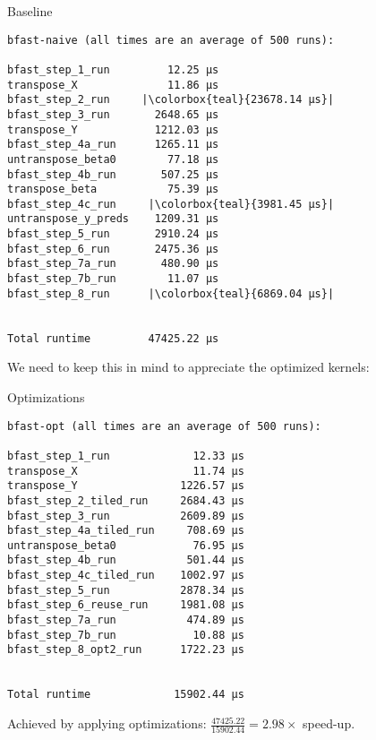 \begin{frame}[fragile]{Baseline}
%
    \centering
    \begin{verbatim}
bfast-naive (all times are an average of 500 runs):

bfast_step_1_run         12.25 µs
transpose_X              11.86 µs
bfast_step_2_run     |\colorbox{teal}{23678.14 µs}|
bfast_step_3_run       2648.65 µs
transpose_Y            1212.03 µs
bfast_step_4a_run      1265.11 µs
untranspose_beta0        77.18 µs
bfast_step_4b_run       507.25 µs
transpose_beta           75.39 µs
bfast_step_4c_run     |\colorbox{teal}{3981.45 µs}|
untranspose_y_preds    1209.31 µs
bfast_step_5_run       2910.24 µs
bfast_step_6_run       2475.36 µs
bfast_step_7a_run       480.90 µs
bfast_step_7b_run        11.07 µs
bfast_step_8_run      |\colorbox{teal}{6869.04 µs}|


Total runtime         47425.22 µs
\end{verbatim}

\pause

We need to keep this in mind to appreciate the optimized kernels:

\end{frame}

\begin{frame}[fragile]{Optimizations}


\centering
\begin{verbatim}
bfast-opt (all times are an average of 500 runs):

bfast_step_1_run             12.33 µs
transpose_X                  11.74 µs
transpose_Y                1226.57 µs
bfast_step_2_tiled_run     2684.43 µs
bfast_step_3_run           2609.89 µs
bfast_step_4a_tiled_run     708.69 µs
untranspose_beta0            76.95 µs
bfast_step_4b_run           501.44 µs
bfast_step_4c_tiled_run    1002.97 µs
bfast_step_5_run           2878.34 µs
bfast_step_6_reuse_run     1981.08 µs
bfast_step_7a_run           474.89 µs
bfast_step_7b_run            10.88 µs
bfast_step_8_opt2_run      1722.23 µs


Total runtime             15902.44 µs
\end{verbatim}

\pause
Achieved by applying optimizations:
\(\frac{47425.22}{15902.44} = 2.98 \times \) speed-up.



\end{frame}


